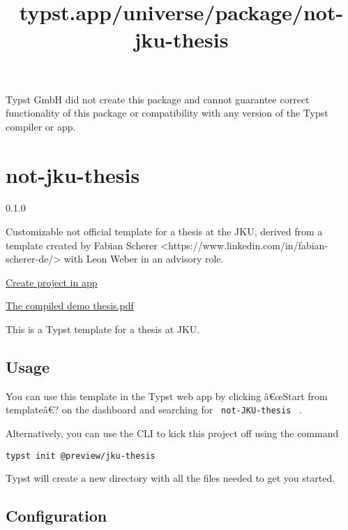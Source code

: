 Typst GmbH did not create this package and cannot guarantee correct
functionality of this package or compatibility with any version of the
Typst compiler or app.


\title{typst.app/universe/package/not-jku-thesis}

\label{banner}
\label{template-thumbnail}

\section{not-jku-thesis}\label{not-jku-thesis}

{ 0.1.0 }

Customizable not official template for a thesis at the JKU, derived from
a template created by Fabian Scherer
\textless https://www.linkedin.com/in/fabian-scherer-de/\textgreater{}
with Leon Weber in an advisory role.

\href{/app?template=not-jku-thesis&version=0.1.0}{Create project in app}

\label{readme}
\href{https://github.com/typst/packages/raw/main/packages/preview/not-jku-thesis/0.1.0/template/thesis.pdf}{The
compiled demo thesis.pdf}

This is a Typst template for a thesis at JKU.

\subsection{Usage}\label{usage}

You can use this template in the Typst web app by clicking â€œStart from
templateâ€? on the dashboard and searching for
\texttt{\ not-JKU-thesis\ } .

Alternatively, you can use the CLI to kick this project off using the
command

\begin{verbatim}
typst init @preview/jku-thesis
\end{verbatim}

Typst will create a new directory with all the files needed to get you
started.

\subsection{Configuration}\label{configuration}

